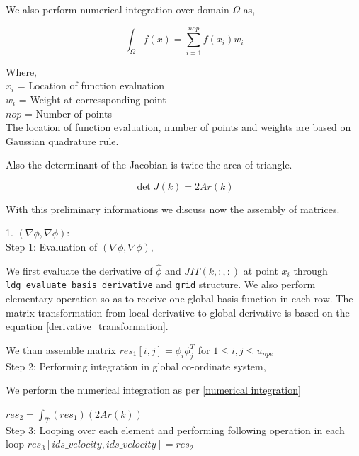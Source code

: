 \documentclass[a4paper]{book}
\begin{document}
We also perform numerical integration over domain $\Omega$ as,

\begin{equation}\label{numerical integration}
\int_{\Omega} f(x) = \sum_{i=1}^{nop} f(x_i) w_i
\end{equation}

Where, \\

$x_i$ = Location of function evaluation\\
$w_i$ = Weight at corressponding point\\
$nop$ = Number of points\\

The location of function evaluation, number of points and weights are based on Gaussian quadrature rule.

Also the determinant of the Jacobian is twice the area of triangle.

\begin{equation}\label{determinant to area}
\det J(k) = 2Ar(k)
\end{equation}

With this preliminary informations we discuss now the assembly of matrices.

1. $(\nabla \phi, \nabla \phi)$:\\

Step 1: Evaluation of $(\nabla \phi , \nabla \phi)$,

We first evaluate the derivative of $\hat{\phi}$ and $JIT(k,:,:)$ at point $x_i$ through \verb|ldg_evaluate_basis_derivative| and \verb|grid| structure. We also perform elementary operation so as to receive one global basis function in each row. The matrix transformation from local derivative to global derivative is based on the equation \ref{derivative_transformation}.

We than assemble matrix $res_1[i,j]=\phi_i \phi_j^T$ for $1 \leq i,j \leq u_{npe}$\\

Step 2: Performing integration in global co-ordinate system,

We perform the numerical integration as per \ref{numerical integration} 

$res_2 = \int_{\hat{T}} (res_1) (2 Ar(k))$\\

Step 3: Looping over each element and performing following operation in each loop $res_3[ids\_velocity,ids\_velocity]=res_2$\\
\end{document}
